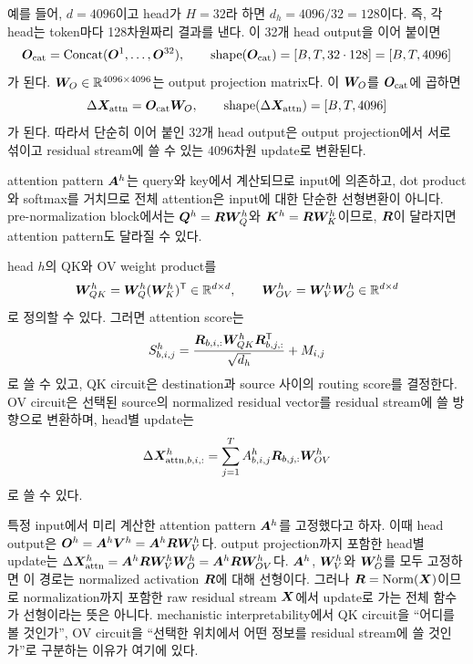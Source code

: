 예를 들어, $d=4096$이고 head가 $H=32$라 하면 $d_h=4096/32=128$이다.
즉, 각 head는 token마다 128차원짜리 결과를 낸다.
이 32개 head output을 이어 붙이면
\begin{equation}
  \bm{O}_{\mathrm{cat}}
  =\operatorname{Concat}(\bm{O}^{1},\ldots,\bm{O}^{32}),
  \qquad
  \operatorname{shape}(\bm{O}_{\mathrm{cat}})
  =\left[B,T,32\cdot128\right]
  =\left[B,T,4096\right]
\end{equation}
가 된다.
$\bm{W}_{O}\in\mathbb{R}^{4096\times4096}$는 output projection matrix다.
이 $\bm{W}_{O}$를 $\bm{O}_{\mathrm{cat}}$에 곱하면
\begin{equation}
  \Delta\bm{X}_{\mathrm{attn}}
  =\bm{O}_{\mathrm{cat}}\bm{W}_{O},
  \qquad
  \operatorname{shape}(\Delta\bm{X}_{\mathrm{attn}})
  =\left[B,T,4096\right]
\end{equation}
가 된다.
따라서 단순히 이어 붙인 32개 head output은 output projection에서 서로 섞이고 residual stream에 쓸 수 있는 4096차원 update로 변환된다.

attention pattern $\bm{A}^{h}$는 query와 key에서 계산되므로 input에 의존하고, dot product와 softmax를 거치므로 전체 attention은 input에 대한 단순한 선형변환이 아니다.
pre-normalization block에서는 $\bm{Q}^{h}=\bm{R}\bm{W}^{h}_{Q}$와 $\bm{K}^{h}=\bm{R}\bm{W}^{h}_{K}$이므로, $\bm{R}$이 달라지면 attention pattern도 달라질 수 있다.

head $h$의 QK와 OV weight product를
\begin{equation}
  \bm{W}^{h}_{QK}
  =\bm{W}^{h}_{Q}(\bm{W}^{h}_{K})^{\mathsf T}
  \in\mathbb{R}^{d\times d},
  \qquad
  \bm{W}^{h}_{OV}
  =\bm{W}^{h}_{V}\bm{W}^{h}_{O}
  \in\mathbb{R}^{d\times d}
\end{equation}
로 정의할 수 있다.
그러면 attention score는
\begin{equation}
  S^{h}_{b,i,j}
  =\frac{\bm{R}_{b,i,:}\bm{W}^{h}_{QK}\bm{R}_{b,j,:}^{\mathsf T}}
         {\sqrt{d_h}}
  +M_{i,j}
\end{equation}
로 쓸 수 있고, QK circuit은 destination과 source 사이의 routing score를 결정한다.
OV circuit은 선택된 source의 normalized residual vector를 residual stream에 쓸 방향으로 변환하며, head별 update는
\begin{equation}
  \Delta\bm{X}^{h}_{\mathrm{attn},b,i,:}
  =\sum_{j=1}^{T}
   A^{h}_{b,i,j}\bm{R}_{b,j,:}\bm{W}^{h}_{OV}
\end{equation}
로 쓸 수 있다.

특정 input에서 미리 계산한 attention pattern $\bm{A}^{h}$를 고정했다고 하자.
이때 head output은 $\bm{O}^{h}=\bm{A}^{h}\bm{V}^{h}=\bm{A}^{h}\bm{R}\bm{W}^{h}_{V}$다.
output projection까지 포함한 head별 update는 $\Delta\bm{X}^{h}_{\mathrm{attn}}=\bm{A}^{h}\bm{R}\bm{W}^{h}_{V}\bm{W}^{h}_{O}=\bm{A}^{h}\bm{R}\bm{W}^{h}_{OV}$다.
$\bm{A}^{h}$, $\bm{W}^{h}_{V}$와 $\bm{W}^{h}_{O}$를 모두 고정하면 이 경로는 normalized activation $\bm{R}$에 대해 선형이다.
그러나 $\bm{R}=\operatorname{Norm}(\bm{X})$이므로 normalization까지 포함한 raw residual stream $\bm{X}$에서 update로 가는 전체 함수가 선형이라는 뜻은 아니다.
mechanistic interpretability에서 QK circuit을 ``어디를 볼 것인가'', OV circuit을 ``선택한 위치에서 어떤 정보를 residual stream에 쓸 것인가''로 구분하는 이유가 여기에 있다.

